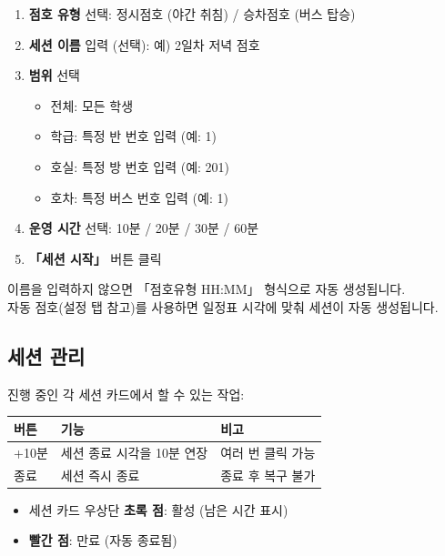 \documentclass[a4paper,11pt]{article}
\begin{document}
\begin{tcolorbox}[stepbox]
\begin{enumerate}
  \item \textbf{점호 유형} 선택: 정시점호 (야간 취침) / 승차점호 (버스 탑승)
  \item \textbf{세션 이름} 입력 (선택): 예) 2일차 저녁 점호
  \item \textbf{범위} 선택
    \begin{itemize}
      \item 전체: 모든 학생
      \item 학급: 특정 반 번호 입력 (예: 1)
      \item 호실: 특정 방 번호 입력 (예: 201)
      \item 호차: 특정 버스 번호 입력 (예: 1)
    \end{itemize}
  \item \textbf{운영 시간} 선택: 10분 / 20분 / 30분 / 60분
  \item \textbf{「세션 시작」} 버튼 클릭
\end{enumerate}
\end{tcolorbox}

\begin{tcolorbox}[tipbox]
이름을 입력하지 않으면 「점호유형 HH:MM」 형식으로 자동 생성됩니다.\\
자동 점호(설정 탭 참고)를 사용하면 일정표 시각에 맞춰 세션이 자동 생성됩니다.
\end{tcolorbox}

\subsection{세션 관리}

진행 중인 각 세션 카드에서 할 수 있는 작업:

\begin{center}
\begin{tabular}{@{}lll@{}}
  \toprule
  \textbf{버튼} & \textbf{기능} & \textbf{비고} \\
  \midrule
  +10분 & 세션 종료 시각을 10분 연장 & 여러 번 클릭 가능 \\
  종료 & 세션 즉시 종료 & 종료 후 복구 불가 \\
  \bottomrule
\end{tabular}
\end{center}

\begin{itemize}
  \item 세션 카드 우상단 \textbf{초록 점}: 활성 (남은 시간 표시)
  \item \textbf{빨간 점}: 만료 (자동 종료됨)
\end{itemize}
\end{document}
